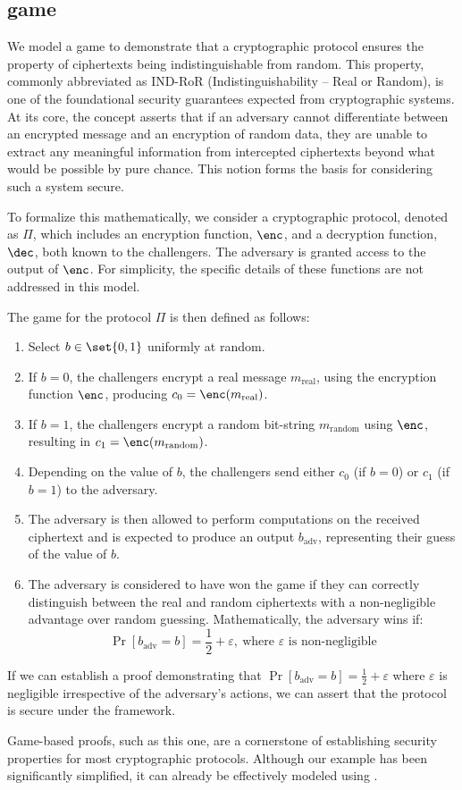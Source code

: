 \subsection{\INDRoR game}
We model a game to demonstrate that a cryptographic protocol ensures the property of ciphertexts being indistinguishable from random. This property, commonly abbreviated as \textsf{IND-RoR} (Indistinguishability -- Real or Random), is one of the foundational security guarantees expected from cryptographic systems. At its core, the concept asserts that if an adversary cannot differentiate between an encrypted message and an encryption of random data, they are unable to extract any meaningful information from intercepted ciphertexts beyond what would be possible by pure chance. This notion forms the basis for considering such a system secure.\par
To formalize this mathematically, we consider a cryptographic protocol, denoted as $\Pi$, which includes an encryption function, $\enc$, and a decryption function, $\dec$, both known to the challengers. The adversary is granted access to the output of $\enc$. For simplicity, the specific details of these functions are not addressed in this model.\par
The \INDRoR game for the protocol $\Pi$ is then defined as follows:
\begin{enumerate}
	\item Select $b\in\set{0,1}$ uniformly at random.
	\item If $b=0$, the challengers encrypt a real message $m_{\text{real}}$, using the encryption function $\enc$, producing $c_0=\enc(m_{\text{real}})$.
	\item If $b=1$, the challengers encrypt a random bit-string $m_{\text{random}}$ using $\enc$, resulting in $c_1=\enc(m_{\text{random}})$.
	\item Depending on the value of $b$, the challengers send either $c_0$ (if $b=0$) or $c_1$ (if $b=1$) to the adversary.
	\item The adversary is then allowed to perform computations on the received ciphertext and is expected to produce an output $b_{\text{adv}}$, representing their guess of the value of $b$.
	\item The adversary is considered to have won the game if they can correctly distinguish between the real and random ciphertexts with a non-negligible advantage over random guessing. Mathematically, the adversary wins if: \[
	\Pr[b_{\text{adv}}=b]=\frac{1}{2}+\varepsilon,\ \text{where $\varepsilon$ is non-negligible}
	\]
\end{enumerate}
If we can establish a proof demonstrating that $\Pr[b_{\text{adv}}=b]=\frac{1}{2}+\varepsilon$ where $\varepsilon$ is negligible irrespective of the adversary's actions, we can assert that the protocol is secure under the \INDRoR framework.\par
Game-based proofs, such as this one, are a cornerstone of establishing security properties for most cryptographic protocols. Although our example has been significantly simplified, it can already be effectively modeled using \EasyCrypt.

